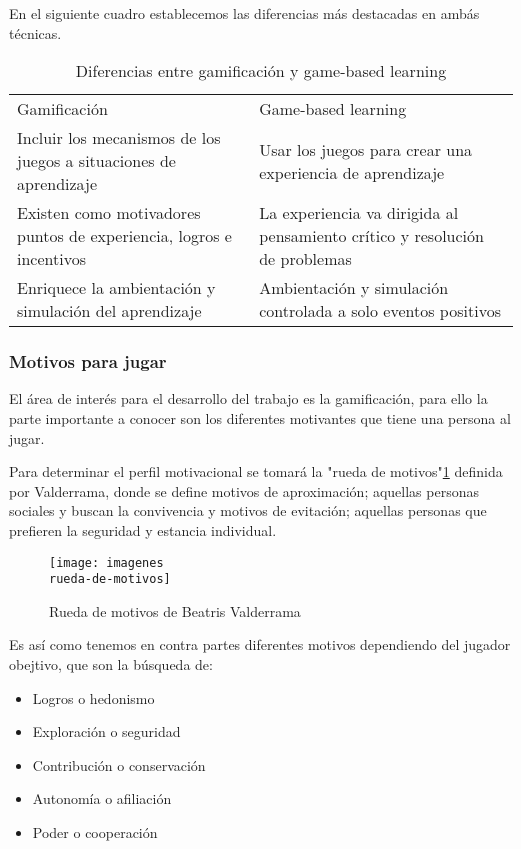 En el siguiente cuadro\cite{gabale} establecemos las diferencias más destacadas en ambás técnicas.

\begin{table}[htbp]
	\centering
	\caption{Diferencias entre gamificación y game-based learning}
	\label{gabale}
	\begin{tabular}{ll}
		Gamificación                                                        & Game-based learning                                                         \\
		Incluir los mecanismos de los juegos a situaciones de aprendizaje   & Usar los juegos para crear una experiencia de aprendizaje                   \\
		Existen como motivadores puntos de experiencia, logros e incentivos & La experiencia va dirigida al pensamiento crítico y resolución de problemas \\
		Enriquece la ambientación y simulación del aprendizaje              & Ambientación y simulación controlada a solo eventos positivos              
	\end{tabular}
\end{table}

\subsubsection{Motivos para jugar}
El área de interés para el desarrollo del trabajo es la gamificación, para ello la parte importante a conocer son los diferentes motivantes que tiene una persona al jugar.

Para determinar el perfil motivacional se tomará la "rueda de motivos"\ref{fig:rm} definida por Valderrama\cite{valde}, donde se define motivos de aproximación; aquellas personas sociales y buscan la convivencia y motivos de evitación; aquellas personas que prefieren la seguridad y estancia individual.
\begin{figure}
	\centering
	\caption{Rueda de motivos de Beatris Valderrama}
	\label{fig:rm}
	\texttt{[image: imagenes\\rueda-de-motivos]}
\end{figure}

Es así como tenemos en contra partes diferentes motivos dependiendo del jugador obejtivo, que son la búsqueda de:
\begin{itemize}
	\item Logros o hedonismo
	\item Exploración o seguridad
	\item Contribución o conservación
	\item Autonomía o afiliación
	\item Poder o cooperación
\end{itemize}
 